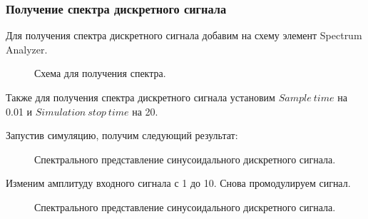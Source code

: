 \documentclass[a4paper,14pt]{extarticle}
\begin{document}
\subsubsection{Получение спектра дискретного сигнала}

Для получения спектра дискретного сигнала добавим на схему элемент Spectrum Analyzer.

\begin{figure}[H]
\caption{Схема для получения спектра.}
\label{003}
\end{figure}

Также для получения спектра дискретного сигнала установим $Sample \ time$ на 0.01 и $Simulation \ stop \ time$ на 20.

Запустив симуляцию, получим следующий результат:

\begin{figure}[H]
\caption{Спектрального представление синусоидального дискретного сигнала.}
\label{006}
\end{figure}

Изменим амплитуду входного сигнала с 1 до 10. Снова промодулируем сигнал.

\begin{figure}[H]
\caption{Спектрального представление синусоидального дискретного сигнала.}
\label{011}
\end{figure}
\end{document}
